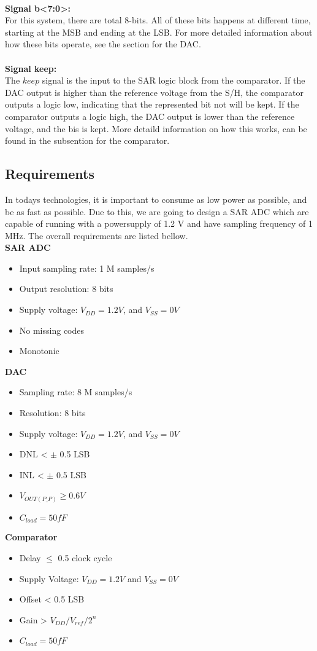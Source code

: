 \documentclass[english, 12pt, a4paper]{article}
\begin{document}
\\
\textbf{Signal b<7:0>:}\\
For this system, there are total 8-bits. All of these bits happens at different time, starting at the MSB and ending at the LSB. For more detailed information about how these bits operate, see
the section for the DAC.\\
\\
\textbf{Signal keep:}\\
The \(keep\) signal is the input to the SAR logic block from the comparator. If the DAC output is higher than the reference voltage from the S/H, the comparator outputs a logic low, indicating
that the represented bit not will be kept. If the comparator outputs a logic high, the DAC output is lower than the reference voltage, and the bis is kept. More detaild information on how this works, 
can be found in the subsention for the comparator.  



\subsection{Requirements}
In todays technologies, it is important to consume as low power as possible, and be as fast as possible. Due to this, we are going to design a SAR ADC which are capable 
of running with a powersupply of 1.2 V and have sampling frequency of 1 MHz. The overall requirements are listed bellow.\\
\textbf{SAR ADC}
\begin{itemize}
 \item Input sampling rate: 1 M samples/s
 \item Output resolution: 8 bits
 \item Supply voltage: \(V_{DD} = 1.2 V\), and \(V_{SS} = 0 V\)
 \item No missing codes
 \item Monotonic
\end{itemize}
\textbf{DAC}
\begin{itemize}
 \item Sampling rate: 8 M samples/s
 \item Resolution: 8 bits
 \item Supply voltage: \(V_{DD} = 1.2 V\), and \(V_{SS} = 0 V\)
 \item DNL < \(\pm\) 0.5 LSB
 \item INL < \(\pm\) 0.5 LSB
 \item \(V_{OUT(P\_P)} \geq 0.6 V\)
 \item \(C_{load} = 50 fF\)
\end{itemize}
\textbf{Comparator}
\begin{itemize}
 \item Delay \(\leq\) 0.5 clock cycle
 \item Supply Voltage: \(V_{DD} = 1.2V\) and \(V_{SS} = 0V\) 
 \item Offset < 0.5 LSB
 \item Gain > \(V_{DD}/V_{ref}/2^{n}\)
 \item \(C_{load} = 50 fF\)
\end{itemize}
\end{document}
